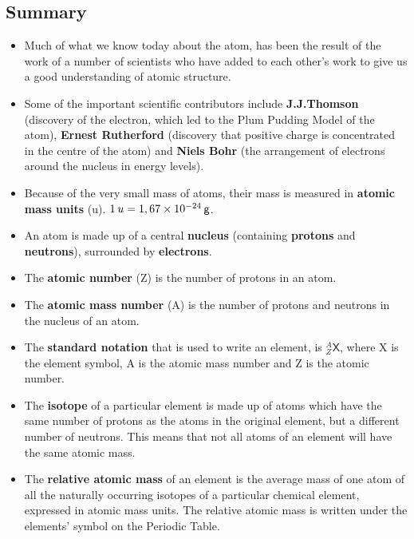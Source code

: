             \subsection*{Summary}
            \nopagebreak
      \label{m38741*id262657}\begin{itemize}[noitemsep]
            \label{m38741*uid169}\item Much of what we know today about the atom, has been the result of the work of a number of scientists who have added to each other's work to give us a good understanding of atomic structure.
\label{m38741*uid170}\item Some of the important scientific contributors include \textbf{J.J.Thomson} (discovery of the electron, which led to the Plum Pudding Model of the atom), \textbf{Ernest Rutherford} (discovery that positive charge is concentrated in the centre of the atom) and \textbf{Niels Bohr} (the arrangement of electrons around the nucleus in energy levels).
\label{m38741*uid171}\item Because of the very small mass of atoms, their mass is measured in \textbf{atomic mass units} (u). $1\phantom{\rule{2pt}{0ex}}u=1,67\ensuremath{\times}10{}^{-24}\phantom{\rule{2pt}{0ex}}\mathsf{g}$.
\label{m38741*uid172}\item An atom is made up of a central \textbf{nucleus} (containing \textbf{protons} and \textbf{neutrons}), surrounded by \textbf{electrons}.
\label{m38741*uid173}\item The \textbf{atomic number} (Z) is the number of protons in an atom.
\label{m38741*uid174}\item The \textbf{atomic mass number} (A) is the number of protons and neutrons in the nucleus of an atom.
\label{m38741*uid175}\item The \textbf{standard notation} that is used to write an element, is $_{Z}^{A}\mathsf{X}$, where X is the element symbol, A is the atomic mass number and Z is the atomic number.
\label{m38741*uid176}\item The \textbf{isotope} of a particular element is made up of atoms which have the same number of protons as the atoms in the original element, but a different number of neutrons. This means that not all atoms of an element will have the same atomic mass.
\label{m38741*uid177}\item The \textbf{relative atomic mass} of an element is the average mass of one atom of all the naturally occurring isotopes of a particular chemical element, expressed in atomic mass units. The relative atomic mass is written under the elements' symbol on the Periodic Table.

\end{itemize}
